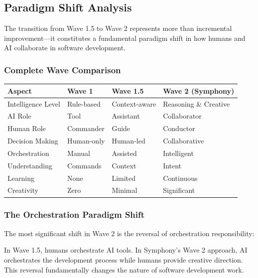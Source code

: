 \subsection{Paradigm Shift Analysis}
\label{subsec:paradigm-shift-analysis}

The transition from Wave 1.5 to Wave 2 represents more than incremental improvement—it constitutes a fundamental paradigm shift in how humans and AI collaborate in software development.

\subsubsection{Complete Wave Comparison}

\begin{center}
\begin{tabular}{@{}llll@{}}
\toprule
\textbf{Aspect} & \textbf{Wave 1} & \textbf{Wave 1.5} & \textbf{Wave 2 (Symphony)} \\
\midrule
Intelligence Level & Rule-based & Context-aware & Reasoning \& Creative \\
AI Role & Tool & Assistant & Collaborator \\
Human Role & Commander & Guide & Conductor \\
Decision Making & Human-only & Human-led & Collaborative \\
Orchestration & Manual & Assisted & Intelligent \\
Understanding & Commands & Context & Intent \\
Learning & None & Limited & Continuous \\
Creativity & Zero & Minimal & Significant \\
\bottomrule
\end{tabular}
\label{tab:complete-wave-evolution}
\end{center}

\subsubsection{The Orchestration Paradigm Shift}

The most significant shift in Wave 2 is the reversal of orchestration responsibility:

\begin{infobox}[title=Orchestration Reversal: The Key Paradigm Shift]
In Wave 1.5, humans orchestrate AI tools. In Symphony's Wave 2 approach, AI orchestrates the development process while humans provide creative direction. This reversal fundamentally changes the nature of software development work.
\end{infobox}

